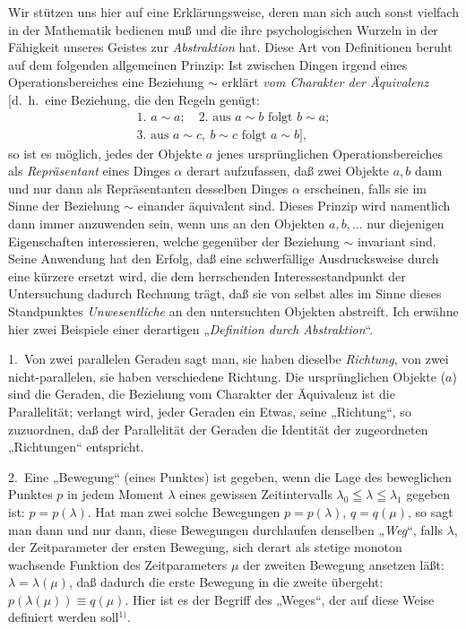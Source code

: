\documentclass{article}
\begin{document}
Wir stützen uns hier auf eine Erklärungsweise, deren man sich auch sonst vielfach in der Mathematik bedienen muß und die ihre psychologischen Wurzeln in der Fähigkeit unseres Geistes zur \emph{Abstraktion} hat. Diese Art von Definitionen beruht auf dem folgenden allgemeinen Prinzip: Ist zwischen Dingen irgend eines Operationsbereiches eine Beziehung $\sim$ erklärt \emph{vom Charakter der Äquivalenz} [d.\ h.\ eine Beziehung, die den Regeln genügt:
\[ \begin{gathered} \text{1.\ } a \sim a; \quad \text{2.\ aus } a \sim b \text{ folgt } b \sim a; \\ \text{3.\ aus } a \sim c, \ b \sim c \text{ folgt } a \sim b], \end{gathered} \]
so ist es möglich, jedes der Objekte $a$ jenes ursprünglichen Operationsbereiches als \emph{Repräsentant} eines Dinges $\alpha$ derart aufzufassen, daß zwei Objekte $a, b$ dann und nur dann als Repräsentanten desselben Dinges $\alpha$ erscheinen, falls sie im Sinne der Beziehung $\sim$ einander äquivalent sind. Dieses Prinzip wird namentlich dann immer anzuwenden sein, wenn uns an den Objekten $a, b, \dots$ nur diejenigen Eigenschaften interessieren, welche gegenüber der Beziehung $\sim$ invariant sind. Seine Anwendung hat den Erfolg, daß eine schwerfällige Ausdrucksweise durch eine kürzere ersetzt wird, die dem herrschenden Interessestandpunkt der Untersuchung dadurch Rechnung trägt, daß sie von selbst alles im Sinne dieses Standpunktes \emph{Unwesentliche} an den untersuchten Objekten abstreift. Ich erwähne hier zwei Beispiele einer derartigen „\emph{Definition durch Abstraktion}“.

1.\ Von zwei parallelen Geraden sagt man, sie haben dieselbe \emph{Richtung}, von zwei nicht-parallelen, sie haben verschiedene Richtung. Die ursprünglichen Objekte ($a$) sind die Geraden, die Beziehung vom Charakter der Äquivalenz ist die Parallelität; verlangt wird, jeder Geraden ein Etwas, seine „Richtung“, so zuzuordnen, daß der Parallelität der Geraden die Identität der zugeordneten „Richtungen“ entspricht.

2.\ Eine „Bewegung“ (eines Punktes) ist gegeben, wenn die Lage des beweglichen Punktes $p$ in jedem Moment $\lambda$ eines gewissen Zeitintervalls $\lambda_0 \leqq \lambda \leqq \lambda_1$ gegeben ist: $p = p(\lambda)$. Hat man zwei solche Bewegungen $p = p(\lambda)$, $q = q(\mu)$, so sagt man dann und nur dann, diese Bewegungen durchlaufen denselben „\emph{Weg}“, falls $\lambda$, der Zeitparameter der ersten Bewegung, sich derart als stetige monoton wachsende Funktion des Zeitparameters $\mu$ der zweiten Bewegung ansetzen läßt: $\lambda = \lambda(\mu)$, daß dadurch die erste Bewegung in die zweite übergeht: $p(\lambda(\mu)) \equiv q(\mu)$. Hier ist es der Begriff des „Weges“, der auf diese Weise definiert werden soll${}^{1)}$.
\end{document}
